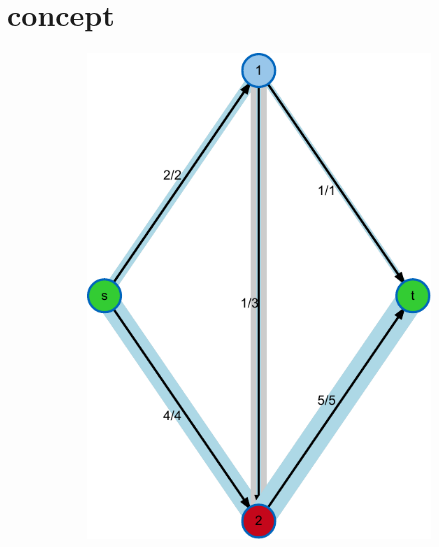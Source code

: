 \section{concept}
\begin{figure}
\centering
\begin{subfigure}[t]{0.45\textwidth}
\includegraphics[width=\textwidth]{fig/maxflow-graph-algorithm-graph}
\end{subfigure}
\begin{subfigure}[t]{0.45\textwidth}

\end{subfigure}
\end{figure}
